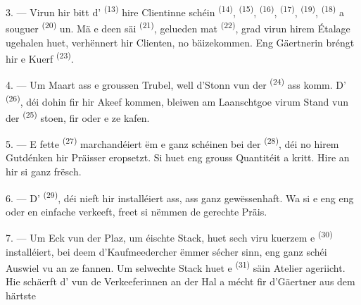 3. --- Virun hir bitt d' \textsuperscript{(13)} hire Clientinne
schéin  \textsuperscript{(14)}, 
\textsuperscript{(15)},  \textsuperscript{(16)},
 \textsuperscript{(17)}, 
\textsuperscript{(19)},  \textsuperscript{(18)} a souguer
 \textsuperscript{(20)} un. Mä e  deen
säi  \textsuperscript{(21)}, gelueden mat 
\textsuperscript{(22)}, grad virun hirem Étalage ugehalen huet, verhënnert hir
Clienten, no bäizekommen. Eng Gäertnerin bréngt hir e Kuerf 
\textsuperscript{(23)}.

\VUsaut{4.0mm}
\VUsaut{3.0mm}

4. --- Um Maart ass e groussen Trubel, well d'Stonn vun der 
\textsuperscript{(24)} ass komm. D' \textsuperscript{(26)}, déi
dohin fir hir Akeef kommen, bleiwen am Laanschtgoe virum Stand vun der
 \textsuperscript{(25)} stoen, fir
 oder e  ze kafen.

5. --- E fette  \textsuperscript{(27)} marchandéiert ëm e ganz schéinen
 bei der  \textsuperscript{(28)}, déi no
hirem Gutdénken hir Präisser eropsetzt. Si huet eng grouss Quantitéit
 a  kritt. Hire
 an hir  si ganz frësch.

\VUsaut{4.0mm}
\VUsaut{3.0mm}

6. --- D' \textsuperscript{(29)}, déi nieft hir
installéiert ass, ass ganz gewëssenhaft. Wa si e  eng
 eng  oder en einfache  verkeeft, freet si
nëmmen de gerechte Präis.

7. --- Um Eck vun der Plaz, um éischte Stack, huet sech viru kuerzem e
 \textsuperscript{(30)} installéiert, bei deem d'Kaufmeedercher
ëmmer sécher sinn, eng ganz schéi Auswiel vu 
 an  ze fannen. Um selwechte Stack
huet e  \textsuperscript{(31)} säin Atelier ageriicht. Hie
schäerft d' vun de Verkeeferinnen an der Hal a mécht fir d'Gäertner
 aus dem härtste 

